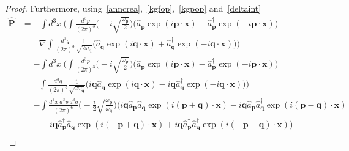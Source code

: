 \begin{proof}
        Furthermore, using~\eqref{anncrea},~\eqref{kgfop},~\eqref{kgpop} and~\eqref{deltaint}
        \begin{equation*}
        \begin{aligned}
            \hat{\mathbf P} & = - \int d^3 x ~ \Big ( \int \frac{d^3 p}{{(2\pi)}^3} \Big (- i\sqrt{\frac{\omega_{\mathbf p}}{2}} \Big ) \Big (\hat a_{\mathbf p} \exp(i \mathbf p \cdot \mathbf x) - \hat a_{\mathbf p}^\dagger \exp(- i \mathbf p \cdot \mathbf x) \Big) \\ & \qquad \nabla \int \frac{d^3 q}{{(2\pi)}^3} \frac{1}{\sqrt{2 \omega_{\mathbf q}}} \Big (\hat a_{\mathbf q} \exp(i \mathbf q \cdot \mathbf x) + \hat a_{\mathbf q}^\dagger \exp(- i \mathbf q \cdot \mathbf x) \Big) \Big ) \\ & = - \int d^3 x ~ \Big ( \int \frac{d^3 p}{{(2\pi)}^3} \Big (- i\sqrt{\frac{\omega_{\mathbf p}}{2}} \Big ) \Big (\hat a_{\mathbf p} \exp(i \mathbf p \cdot \mathbf x) - \hat a_{\mathbf p}^\dagger \exp(- i \mathbf p \cdot \mathbf x) \Big) \\ & \qquad \int \frac{d^3 q}{{(2\pi)}^3} \frac{1}{\sqrt{2 \omega_{\mathbf q}}} \Big (i \mathbf q \hat a_{\mathbf q} \exp(i \mathbf q \cdot \mathbf x) - i \mathbf q \hat a_{\mathbf q}^\dagger \exp(- i \mathbf q \cdot \mathbf x) \Big) \Big ) \\ & = - \int \frac{d^3 x ~ d^3 p ~ d^3 q}{{(2\pi)}^6} \Big (- \frac{i}{2} \sqrt{\frac{\omega_{\mathbf p}}{\omega_{\mathbf q}}} \Big ) (i \mathbf q \hat a_{\mathbf p} \hat a_{\mathbf q} \exp(i (\mathbf p + \mathbf q) \cdot \mathbf x) - i \mathbf q  \hat a_{\mathbf p} \hat a_{\mathbf q}^\dagger \exp(i (\mathbf p - \mathbf q) \cdot \mathbf x) \\ & \qquad - i \mathbf q \hat a_{\mathbf p}^\dagger \hat a_{\mathbf q} \exp(i (- \mathbf p + \mathbf q) \cdot \mathbf x) + i \mathbf q \hat a_{\mathbf p}^\dagger \hat a_{\mathbf q}^\dagger \exp(i (- \mathbf p - \mathbf q) \cdot \mathbf x) )
        \end{aligned}
        \end{equation*}
        \begin{equation*}
        \begin{aligned}

\end{aligned}
\end{equation*}
\end{proof}
